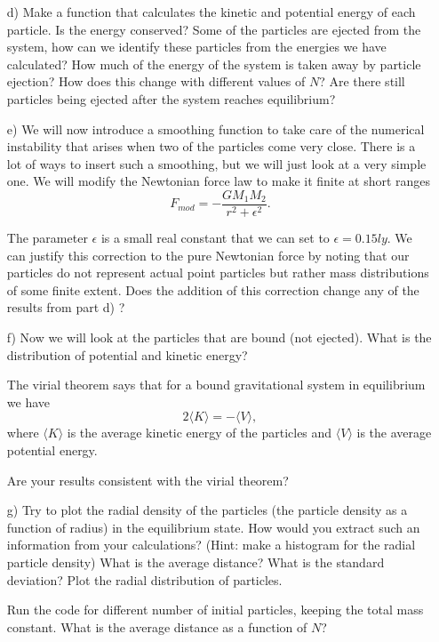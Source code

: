 \documentclass[10pt]{article}
\begin{document}
\begin{enumerate}
\item[d)] Make a function that calculates the kinetic and potential
  energy of each particle. Is the energy conserved? Some of the
  particles are ejected from the system, how can we identify these
  particles from the energies we have calculated? How much of the
  energy of the system is taken away by particle ejection? How does
  this change with different values of $N$? Are there still particles
  being ejected after the system reaches equilibrium?


\item[e)] We will now introduce a smoothing function to take care of
  the numerical instability that arises when two of the particles come
  very close. There is a lot of ways to insert such a smoothing, but
  we will just look at a very simple one. We will modify the Newtonian
  force law to make it finite at short ranges
\[ F_{mod} = -\frac{GM_1M_2}{r^2 + \epsilon^2}.\]

The parameter $\epsilon$ is a small real constant that we can set to $ \epsilon
= 0.15 ly$. We can justify this correction to the pure Newtonian force
by noting that our particles do not represent actual point particles
but rather mass distributions of some finite extent. Does the addition
of this correction change any of the results from part d) ?


\item[f)] Now we will look at the particles that are bound (not
  ejected). What is the distribution of potential and kinetic energy?

The virial theorem says that for a bound gravitational system in
equilibrium we have
\[
2\langle K\rangle = -\langle V \rangle,
\] 
where $\langle K\rangle$
is the average kinetic energy of the particles and $ \langle V
\rangle$ is the average potential energy.

Are your results consistent with the virial theorem? 

\item[g)] Try to plot the radial density of the particles (the particle density as a function of radius) in the
  equilibrium state. How would you extract such an information from your calculations? (Hint: make a histogram for the radial
particle density) What is the average distance? What is the
  standard deviation? Plot the radial distribution of particles.

Run the code for different number of initial particles, keeping the
total mass constant. What is the average distance as a function of $N$?


\end{enumerate}
\end{document}
